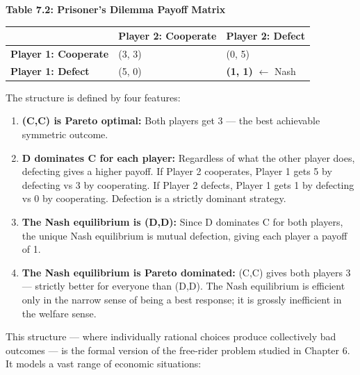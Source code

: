 \documentclass[12pt, letterpaper]{article}
\begin{document}
\textbf{Table 7.2: Prisoner's Dilemma Payoff Matrix}


\begin{table}[H]
\centering
\small
\begin{tabularx}{\linewidth}{lYY}
\toprule
 & Player 2: Cooperate & Player 2: Defect \\
\midrule
\textbf{Player 1: Cooperate} & (3, 3) & (0, 5) \\
\textbf{Player 1: Defect} & (5, 0) & \textbf{(1, 1)} $\leftarrow$ Nash \\
\bottomrule
\end{tabularx}
\end{table}


The structure is defined by four features:
\begin{enumerate}
\item \textbf{(C,C) is Pareto optimal:} Both players get 3 --- the best achievable symmetric outcome.
\item \textbf{D dominates C for each player:} Regardless of what the other player does, defecting gives a higher payoff. If Player 2 cooperates, Player 1 gets 5 by defecting vs 3 by cooperating. If Player 2 defects, Player 1 gets 1 by defecting vs 0 by cooperating. Defection is a strictly dominant strategy.
\item \textbf{The Nash equilibrium is (D,D):} Since D dominates C for both players, the unique Nash equilibrium is mutual defection, giving each player a payoff of 1.
\item \textbf{The Nash equilibrium is Pareto dominated:} (C,C) gives both players 3 --- strictly better for everyone than (D,D). The Nash equilibrium is efficient only in the narrow sense of being a best response; it is grossly inefficient in the welfare sense.
\end{enumerate}

This structure --- where individually rational choices produce collectively bad outcomes --- is the formal version of the free-rider problem studied in Chapter 6. It models a vast range of economic situations:
\end{document}
